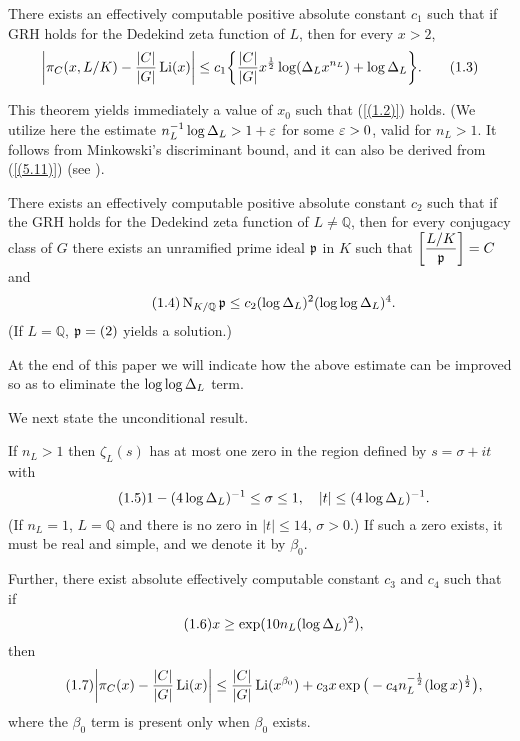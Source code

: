 \documentclass[./main]{subfiles}
\begin{document}
\begin{theorem} \label{1.1}
There exists an effectively computable positive absolute constant $c_1$ such that if GRH holds for the Dedekind zeta function of $L$, then for every $x>2$, 
\[ \bigg| \pi_C(x, L/K) - \frac{|C|}{|G|} \operatorname{Li}(x) \bigg| \le c_1 \bigg\{ \frac{|C|}{|G|} x^{\frac{1}{2}} \log(\Delta_L x^{n_L}) + \log \Delta_L \bigg\}.\tag{1.3} \label{(1.3)} \]
\end{theorem}

This theorem yields immediately a value of $x_0$ such that (\ref{(1.2)}) holds. (We utilize here the estimate $n_L^{-1} \log \Delta_L > 1 + \varepsilon$ for some $\varepsilon > 0$, valid for $n_L > 1$. It follows from Minkowski's discriminant bound, and it can also be derived from (\ref{(5.11)}) (see \cite{11-odlyzko1977}). 

\begin{corollary} \label{1.2}
There exists an effectively computable positive absolute constant $c_2$ such that if the GRH holds for the Dedekind zeta function of $L \ne \mathbb Q$, then for every conjugacy class of $G$ there exists an unramified prime ideal $\mathfrak{p}$ in $K$ such that $\bigg[\dfrac{L/K}{\mathfrak{p}}\bigg] = C$ and 
\[ \tag{1.4}\label{(1.4)} \operatorname{N}_{K/\mathbb Q} \mathfrak{p} \le c_2(\log \Delta_L)^2 (\log \log \Delta_L)^4. \]
(If $L = \mathbb Q$, $\mathfrak{p} = (2)$ yields a solution.)
\end{corollary}


At the end of this paper we will indicate how the above estimate can be improved so as to eliminate the $\log \log \Delta_L$ term.

We next state the unconditional result.

\begin{theorem} \label{1.3}
If $n_L > 1$ then $\zeta_L(s)$ has at most one zero in the region defined by $s = \sigma +it$  with 
\[ \tag{1.5}\label{(1.5)} 1 - (4\log\Delta_L)^{-1} \le \sigma \le 1, \hspace{1em} |t| \le (4\log\Delta_L)^{-1}. \]
(If $n_L = 1$, $L = \mathbb Q$ and there is no zero in $|t| \le 14$, $\sigma > 0$.)
\newline If such a zero exists, it must be real and simple, and we denote it by $\beta_0$. 

Further, there exist absolute effectively computable constant $c_3$ and $c_4$ such that if
\[ \tag{1.6}\label{(1.6)} x\ge \exp (10 n_L (\log \Delta_L)^2 ), \]
then
\[ \tag{1.7}\label{(1.7)}
    \bigg| \pi_C (x) - \frac{|C|}{|G|} \operatorname{Li}(x) \bigg| \le \frac{|C|}{|G|} \operatorname{Li} (x^{\beta_0}) + c_3x \exp \big(-c_4n_L^{-\frac{1}{2}}(\log x)^{\frac 12}\big),
\]
where the $\beta_0$ term is present only when $\beta_0$ exists.
\end{theorem}
\end{document}
